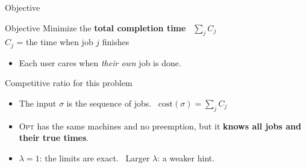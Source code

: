 \documentclass[12pt]{beamer}   %
\newcommand{\Opt}{\textsc{Opt}}
\newcommand{\cost}{\mathrm{cost}}
\newcommand{\gbar}[5]{\draw[#4] (#1,#3) rectangle (#2,#3+0.7) node[pos=.5]{#5};}
\begin{document}
\begin{frame}{Objective}
  \begin{block}{Objective}
    Minimize the \textbf{total completion time} \ $\displaystyle\sum_j C_j$\\[2pt]
    $C_j$ = the time when job $j$ finishes
  \end{block}
  \vspace{1mm}
  \begin{itemize}
    \item<2-> Each user cares when \emph{their own} job is done.
  \end{itemize}
  \vspace{1mm}
  \centering

  \vspace{1mm}
\end{frame}

\begin{frame}{Competitive ratio for this problem}
  \begin{itemize}\setlength{\itemsep}{3mm}
    \item<1-> The input $\sigma$ is the sequence of jobs. \ $\cost(\sigma) = \sum_j C_j$
    \item<2-> \Opt{} has the same machines and no preemption, but it \textbf{knows all jobs and their true times}.
    \item<3-> $\lambda = 1$: the limits are exact. \ Larger $\lambda$: a weaker hint.
  \end{itemize}
  \vspace{3mm}
\end{frame}

\end{document}
